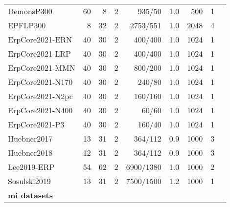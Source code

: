 \begin{tabularx}{\linewidth}{@{}Xrrrrrrrr@{}}
	DemonsP300                 & 60              & 8        & 2         & 935/50          & 1.0  & 500  & 1                 & \cite{Goncharenko2020}   \\
	EPFLP300                   & 8               & 32       & 2         & 2753/551        & 1.0  & 2048 & 4                 & \cite{Hoffmann2008}      \\
	ErpCore2021-ERN            & 40              & 30       & 2         & 400/400         & 1.0  & 1024 & 1                 & \cite{Kappenman2021}     \\
	ErpCore2021-LRP            & 40              & 30       & 2         & 400/400         & 1.0  & 1024 & 1                 & \cite{Kappenman2021}     \\
	ErpCore2021-MMN            & 40              & 30       & 2         & 800/200         & 1.0  & 1024 & 1                 & \cite{Kappenman2021}     \\
	ErpCore2021-N170           & 40              & 30       & 2         & 240/80          & 1.0  & 1024 & 1                 & \cite{Kappenman2021}     \\
	ErpCore2021-N2pc           & 40              & 30       & 2         & 160/160         & 1.0  & 1024 & 1                 & \cite{Kappenman2021}     \\
	ErpCore2021-N400           & 40              & 30       & 2         & 60/60           & 1.0  & 1024 & 1                 & \cite{Kappenman2021}     \\
	ErpCore2021-P3             & 40              & 30       & 2         & 160/40          & 1.0  & 1024 & 1                 & \cite{Kappenman2021}     \\
	Huebner2017                & 13              & 31       & 2         & 364/112         & 0.9  & 1000 & 3                 & \cite{Huebner2017}       \\
	Huebner2018                & 12              & 31       & 2         & 364/112         & 0.9  & 1000 & 3                 & \cite{Huebner2018}       \\
	Lee2019-ERP                & 54              & 62       & 2         & 6900/1380       & 1.0  & 1000 & 2                 & \cite{Lee2019}           \\
	Sosulski2019               & 13              & 31       & 2         & 7500/1500       & 1.2  & 1000 & 1                 & \cite{Sosulski2019}      \\
	\midrule
	\textbf{\Ac{mi} datasets}  &                 &          &           &                 &      &      &                   &                          \\

\end{tabularx}
